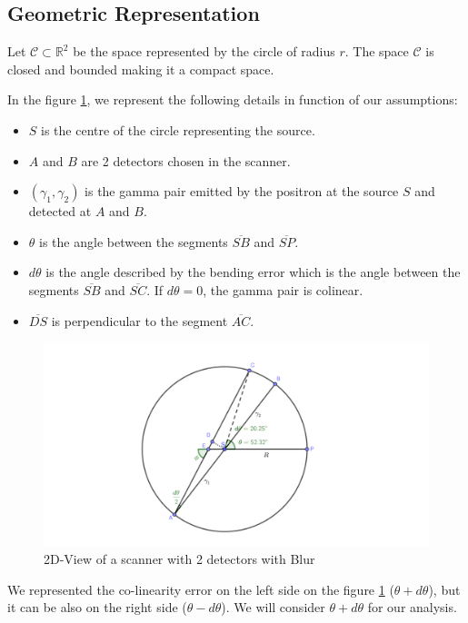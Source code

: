 \documentclass{article}
\begin{document}
\subsection{Geometric Representation}
Let $\mathcal{C} \subset \mathbb{R}^2$ be the space represented by the circle of radius $r$. The space $\mathcal{C}$ is closed and bounded making it a compact space. 

In the figure \ref{fig:Scanner_Assumptions}, we represent the following details in function of our assumptions:

\begin{itemize}
	\item $S$ is the centre of the circle representing the source.
	\item $A$ and $B$ are 2 detectors chosen in the scanner.
	\item $(\gamma_1, \gamma_2)$ is the gamma pair emitted by the positron at the source $S$ and detected at $A$ and $B$.
	\item $\theta$ is the angle between the segments $\overline{S B}$ and $\overline{SP}$.
	\item $d\theta$ is the angle described by the bending error which is the angle between the segments $\overline{S B}$ and $\overline{S C}$. If $d\theta = 0$, the gamma pair is colinear.
	\item $\overline{D S}$ is perpendicular to the segment $\overline{A C}$.
\end{itemize}

\begin{figure}[ht!]
\centering
\includegraphics[width=121mm]{Images/Scanner_Blur.pdf}
\caption{2D-View of a scanner with 2 detectors with Blur
\label{fig:Scanner_Assumptions}}
\end{figure}

We represented the co-linearity error on the left side on the figure \ref{fig:Scanner_Assumptions} ($\theta + d\theta$), but it can be also on the right side ($\theta - d\theta$). We will consider $\theta + d\theta$ for our analysis.
\end{document}
